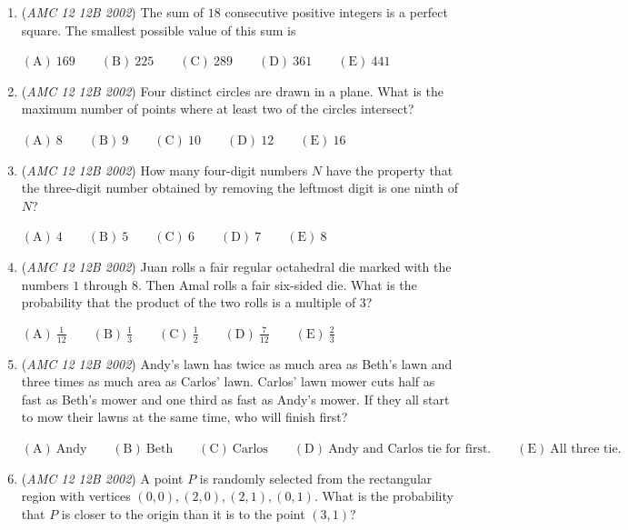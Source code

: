 \begin{enumerate}
	\item (\textit{AMC 12 12B 2002}) The sum of $18$ consecutive positive integers is a perfect square. The smallest possible value of this sum is


 $\mathrm{(A)}\ 169 \qquad\mathrm{(B)}\ 225 \qquad\mathrm{(C)}\ 289 \qquad\mathrm{(D)}\ 361 \qquad\mathrm{(E)}\ 441$


	\item (\textit{AMC 12 12B 2002}) Four distinct circles are drawn in a plane. What is the maximum number of points where at least two of the circles intersect?


 $\mathrm{(A)}\ 8 \qquad\mathrm{(B)}\ 9 \qquad\mathrm{(C)}\ 10 \qquad\mathrm{(D)}\ 12 \qquad\mathrm{(E)}\ 16$


	\item (\textit{AMC 12 12B 2002}) How many four-digit numbers $N$ have the property that the three-digit number obtained by removing the leftmost digit is one ninth of $N$?


 $\mathrm{(A)}\ 4 \qquad\mathrm{(B)}\ 5 \qquad\mathrm{(C)}\ 6 \qquad\mathrm{(D)}\ 7 \qquad\mathrm{(E)}\ 8$


	\item (\textit{AMC 12 12B 2002}) Juan rolls a fair regular octahedral die marked with the numbers $1$ through $8$. Then Amal rolls a fair six-sided die. What is the probability that the product of the two rolls is a multiple of 3?


 $\mathrm{(A)}\ \frac1{12} \qquad\mathrm{(B)}\ \frac 13 \qquad\mathrm{(C)}\ \frac 12 \qquad\mathrm{(D)}\  \frac 7{12} \qquad\mathrm{(E)}\ \frac 23$


	\item (\textit{AMC 12 12B 2002}) Andy’s lawn has twice as much area as Beth’s lawn and three times as much area as Carlos’ lawn. Carlos’ lawn mower cuts half as fast as Beth’s mower and one third as fast as Andy’s mower. If they all start to mow their lawns at the same time, who will finish first?


 $\mathrm{(A)}\ \text{Andy} \qquad\mathrm{(B)}\ \text{Beth} \qquad\mathrm{(C)}\ \text{Carlos} \qquad\mathrm{(D)}\ \text{Andy\ and \ Carlos\ tie\ for\ first.} \qquad\mathrm{(E)}\ \text{All\ three\ tie.}$


	\item (\textit{AMC 12 12B 2002}) A point $P$ is randomly selected from the rectangular region with vertices $(0,0),(2,0),(2,1),(0,1)$. What is the probability that $P$ is closer to the origin than it is to the point $(3,1)$?



\end{enumerate}
